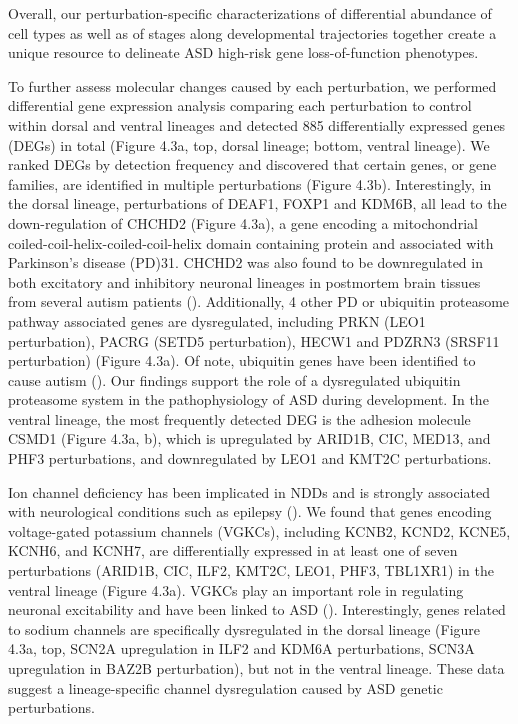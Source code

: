Overall, our perturbation-specific characterizations of differential abundance of cell types as well as of stages along developmental trajectories together create a unique resource to delineate ASD high-risk gene loss-of-function phenotypes.

To further assess molecular changes caused by each perturbation, we performed differential gene expression analysis comparing each perturbation to control within dorsal and ventral lineages and detected 885 differentially expressed genes (DEGs) in total (Figure 4.3a, top, dorsal lineage; bottom, ventral lineage). We ranked DEGs by detection frequency and discovered that certain genes, or gene families, are identified in multiple perturbations (Figure 4.3b). Interestingly, in the dorsal lineage, perturbations of DEAF1, FOXP1 and KDM6B, all lead to the down-regulation of CHCHD2 (Figure 4.3a), a gene encoding a mitochondrial coiled-coil-helix-coiled-coil-helix domain containing protein and associated with Parkinson's disease (PD)31. CHCHD2 was also found to be downregulated in both excitatory and inhibitory neuronal lineages in postmortem brain tissues from several autism patients (\cite{velmeshev_single-cell_2019}). Additionally, 4 other PD or ubiquitin proteasome pathway associated genes are dysregulated, including PRKN (LEO1 perturbation), PACRG (SETD5 perturbation), HECW1 and PDZRN3 (SRSF11 perturbation) (Figure 4.3a). Of note, ubiquitin genes have been identified to cause autism (\cite{glessner_autism_2009}). Our findings support the role of a dysregulated ubiquitin proteasome system in the pathophysiology of ASD during development. In the ventral lineage, the most frequently detected DEG is the adhesion molecule CSMD1 (Figure 4.3a, b), which is upregulated by ARID1B, CIC, MED13, and PHF3 perturbations, and downregulated by LEO1 and KMT2C perturbations.

Ion channel deficiency has been implicated in NDDs and is strongly associated with neurological conditions such as epilepsy (\cite{consortium_novo_2018}). We found that genes encoding voltage-gated potassium channels (VGKCs), including KCNB2, KCND2, KCNE5, KCNH6, and KCNH7, are differentially expressed in at least one of seven perturbations (ARID1B, CIC, ILF2, KMT2C, LEO1, PHF3, TBL1XR1) in the ventral lineage (Figure 4.3a). VGKCs play an important role in regulating neuronal excitability and have been linked to ASD (\cite{lee_exome_2014}). Interestingly, genes related to sodium channels are specifically dysregulated in the dorsal lineage (Figure 4.3a, top, SCN2A upregulation in ILF2 and KDM6A perturbations, SCN3A upregulation in BAZ2B perturbation), but not in the ventral lineage. These data suggest a lineage-specific channel dysregulation caused by ASD genetic perturbations. 


